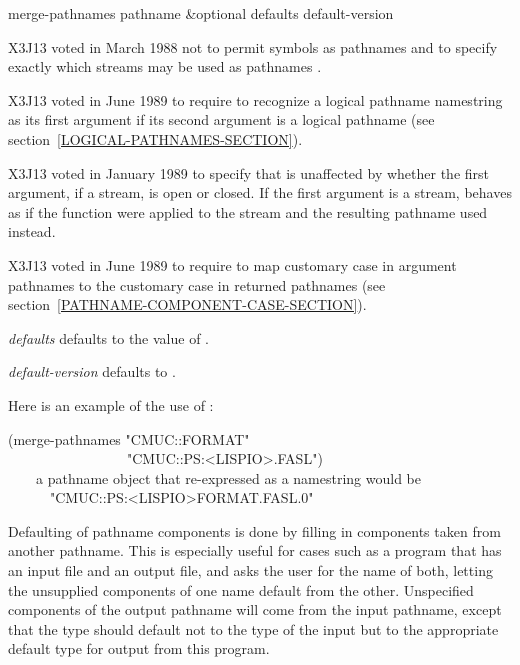\begin{defun}[Function]
merge-pathnames pathname &optional defaults default-version

\begin{new}
X3J13 voted in March 1988
not to permit symbols as pathnames
 and
to specify exactly which streams may be used as pathnames
.
\end{new}

\begin{newer}
X3J13 voted in June 1989  to require 
to recognize a logical pathname namestring as its first argument
if its second argument is a logical pathname (see section~\ref{LOGICAL-PATHNAMES-SECTION}).
\end{newer}

\begin{new}
X3J13 voted in January 1989
to specify that  is unaffected by
whether the first argument, if a stream, is open or closed. If the first
argument is a stream,  behaves as if the function
 were applied to the stream and the resulting pathname used instead.
\end{new}

\begin{newer}
X3J13 voted in June 1989  to
require  to map customary case in argument
pathnames to the customary case in returned pathnames
(see section~\ref{PATHNAME-COMPONENT-CASE-SECTION}).
\end{newer}

\emph{defaults} defaults to the value of .

\emph{default-version} defaults to .

Here is an example of the use of :
\begin{lisp}
(merge-pathnames "CMUC::FORMAT" \\
~~~~~~~~~~~~~~~~~"CMUC::PS:<LISPIO>.FASL") \\
~~~\EV\ \textrm{a pathname object that re-expressed as a namestring would be} \\
~~~~~~"CMUC::PS:<LISPIO>FORMAT.FASL.0"
\end{lisp}

Defaulting of pathname components is done by filling in components taken
from another pathname.
This is especially useful for
cases such as a program that has an input file and an output file, and
asks the user for the name of both, letting the unsupplied components of
one name default from the other.  Unspecified components of the output
pathname will come from the input pathname, except that the type should
default not to the type of the input but to the appropriate default type
for output from this program.


\end{defun}
